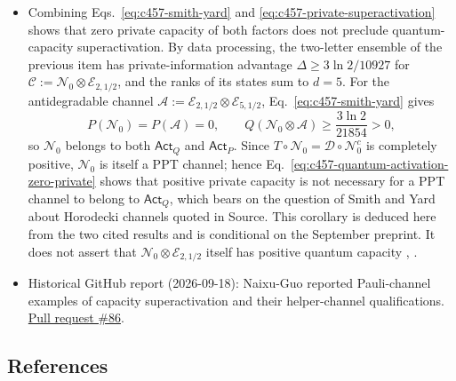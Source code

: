 \begin{itemize}
  \item Combining Eqs.~\eqref{eq:c457-smith-yard} and \eqref{eq:c457-private-superactivation} shows that zero private capacity of both factors does not preclude quantum-capacity superactivation. By data processing, the two-letter ensemble of the previous item has private-information advantage $\Delta\geq3\ln2/10927$ for $\mathcal C:=\mathcal N_0\otimes\mathcal E_{2,1/2}$, and the ranks of its states sum to $d=5$. For the antidegradable channel $\mathcal A:=\mathcal E_{2,1/2}\otimes\mathcal E_{5,1/2}$, Eq.~\eqref{eq:c457-smith-yard} gives
\begin{equation}
 P(\mathcal N_0)=P(\mathcal A)=0,
 \qquad
 Q(\mathcal N_0\otimes\mathcal A)\geq\frac{3\ln2}{21854}>0,
 \label{eq:c457-quantum-activation-zero-private}
\end{equation}
so $\mathcal N_0$ belongs to both $\mathsf{Act}_Q$ and $\mathsf{Act}_P$. Since $T\circ\mathcal N_0=\mathcal D\circ\mathcal N_0^c$ is completely positive, $\mathcal N_0$ is itself a PPT channel; hence Eq.~\eqref{eq:c457-quantum-activation-zero-private} shows that positive private capacity is not necessary for a PPT channel to belong to $\mathsf{Act}_Q$, which bears on the question of Smith and Yard about Horodecki channels quoted in Source. This corollary is deduced here from the two cited results and is conditional on the September preprint. It does not assert that $\mathcal N_0\otimes\mathcal E_{2,1/2}$ itself has positive quantum capacity , .

  \item Historical GitHub report (2026-09-18): Naixu-Guo reported Pauli-channel examples of capacity superactivation and their helper-channel qualifications. \href{https://github.com/Naixu-Guo/quantum-open-problems/pull/86}{Pull request \#86}.
\end{itemize}

\subsection*{References}

